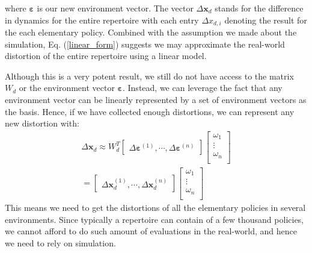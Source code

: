 \documentclass[journal]{IEEEtran}
\begin{document}
where $\bm{\varepsilon}$ is our new environment vector. 
The vector $\Delta \bm{x}_d$ stands for the difference in dynamics for the entire repertoire with each entry $\Delta x_{d, i}$ denoting the result for the each elementary policy.
Combined with the assumption we made about the simulation, Eq. (\ref{linear_form}) suggests we may approximate the real-world distortion of the entire repertoire using a linear model. 


Although this is a very potent result, we still do not have access to the matrix $W_d$ or the environment vector $\bm{\varepsilon}$. 
Instead, we can leverage the fact that any environment vector can be linearly represented by a set of environment vectors as the basis.
Hence, if we have collected enough distortions, we can represent any new distortion with:
\begin{equation}
\begin{gathered}
\Delta \bm{x}_d \approx
W_{d}^T
\begin{bmatrix}
\Delta \bm{\varepsilon}^{(1)}, \cdots, \Delta \bm{\varepsilon}^{(n)}
\end{bmatrix}
\begin{bmatrix}
\omega_1 \\
\vdots \\
\omega_n \\
\end{bmatrix}
\\ =
\begin{bmatrix}
\Delta \bm{x}_d^{(1)}, \cdots, \Delta \bm{x}_d^{(n)}
\end{bmatrix}
\begin{bmatrix}
\omega_1 \\
\vdots \\
\omega_n \\
\end{bmatrix}
\end{gathered}
\label{linear_combination}
\end{equation}
This means we need to get the distortions of all the elementary policies in several environments.
Since typically a repertoire can contain of a few thousand policies,
we cannot afford to do such amount of evaluations in the real-world, and hence we need to rely on simulation.
\end{document}
